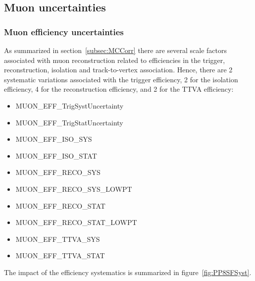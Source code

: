 {\subsection{Muon uncertainties}
\label{sec:muonuncerts}

\subsubsection{Muon efficiency uncertainties}
As summarized in section~\ref{subsec:MCCorr} there are several scale factors associated with muon reconstruction related to efficiencies in the trigger, reconstruction, isolation and track-to-vertex association.
Hence, there are 2 systematic variations associated with the trigger efficiency, 2 for the isolation efficiency, 4 for the reconstruction efficiency, and 2 for the TTVA efficiency:
\begin{itemize}
  \setlength{\itemsep}{1pt}\setlength{\parskip}{0pt}\setlength{\parsep}{0pt}
  \item MUON\_EFF\_TrigSystUncertainty
  \item MUON\_EFF\_TrigStatUncertainty
  \item MUON\_EFF\_ISO\_SYS
  \item MUON\_EFF\_ISO\_STAT
  \item MUON\_EFF\_RECO\_SYS
  \item MUON\_EFF\_RECO\_SYS\_LOWPT
  \item MUON\_EFF\_RECO\_STAT
  \item MUON\_EFF\_RECO\_STAT\_LOWPT
  \item MUON\_EFF\_TTVA\_SYS
  \item MUON\_EFF\_TTVA\_STAT
\end{itemize}

The impact of the efficiency systematics is summarized in figure~\ref{fig:PP8SFSyst}.

}
